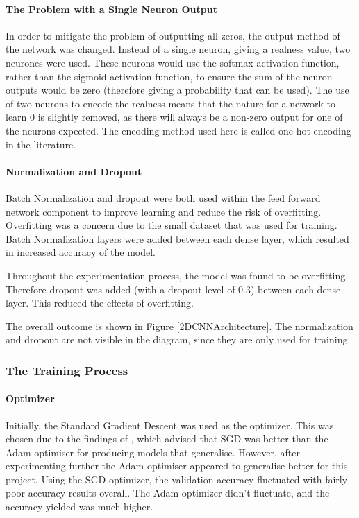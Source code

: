\documentclass[11pt,a4paper]{article}
\begin{document}
                \paragraph{The Problem with a Single Neuron Output}
                In order to mitigate the problem of outputting all zeros, the output method of the network was changed. Instead of a single neuron, giving a realness value, two neurones were used.
                These neurons would use the softmax activation function, rather than the sigmoid activation function, to ensure the sum of the neuron outputs would be zero (therefore giving a probability that can be used).
                The use of two neurons to encode the realness means that the nature for a network to learn 0 is slightly removed, as there will always be a non-zero output for one of the neurons expected. The encoding method used here
                is called one-hot encoding in the literature.

                \paragraph{Normalization and Dropout}
                Batch Normalization and dropout were both used within the feed forward network component to improve learning and reduce the risk of overfitting. Overfitting was a concern due to the small dataset that was used for training.
                Batch Normalization layers were added between each dense layer, which resulted in increased accuracy of the model.



                Throughout the experimentation process, the model was found to be overfitting. Therefore dropout was added (with a dropout level of 0.3) between each dense layer. This reduced the effects of overfitting.

                The overall outcome is shown in Figure \ref{2DCNNArchitecture}. The normalization and dropout are not visible in the diagram, since they are only used for training.


            \subsubsection{The Training Process}
                \paragraph{Optimizer}
                Initially, the Standard Gradient Descent was used as the optimizer. This was chosen due to the findings of \cite{SGDBetterThanAdamForImageClassification},
                which advised that SGD was better than the Adam optimiser for producing models that generalise. However, after experimenting further the Adam optimiser appeared
                to generalise better for this project. Using the SGD optimizer, the validation accuracy fluctuated with fairly poor accuracy results overall. The Adam optimizer
                didn't fluctuate, and the accuracy yielded was much higher.
\end{document}
